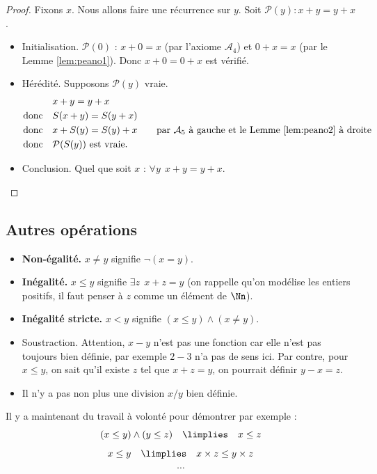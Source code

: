 \documentclass[11pt,class=report,crop=false]{standalone}
\begin{document}
\begin{proof}
Fixons $x$. Nous allons faire une récurrence sur $y$. 
Soit $\mathcal{P}(y) : x+y = y+x$.
\begin{itemize}
	\item Initialisation. $\mathcal{P}(0)$ : $x+0=x$ (par l'axiome $\mathcal{A}_4$) et $0+x=x$ (par le Lemme \ref{lem:peano1}). Donc $x+0=0+x$ est vérifié.
	
	\item Hérédité. Supposons $\mathcal{P}(y)$ vraie. 
	\begin{align*}
					& x+y = y+x \\
		\text{donc} \quad & S(x+y) = S(y+x) \\
		\text{donc} \quad & x+S(y) = S(y)+x \qquad \text{par $\mathcal{A}_5$ à gauche et le Lemme \ref{lem:peano2} à droite} \\
		\text{donc} \quad & \mathcal{P}(S(y)) \text{ est vraie.} 
	\end{align*}	
		
	\item Conclusion. Quel que soit $x$ : $\forall y \ \ x+y=y+x$.
\end{itemize}
\end{proof}

\subsection{Autres opérations}


\begin{itemize}
	\item \textbf{Non-égalité.} $x \neq y$ signifie $\lnot(x=y)$.
	\item \textbf{Inégalité.} $x \le y$ signifie $\exists z \ \ x+z=y$ (on rappelle qu'on modélise les entiers positifs, il faut penser à $z$ comme un élément de $\Nn$).
	\item \textbf{Inégalité stricte.} $x < y$ signifie $(x \le y) \land (x \neq y)$.
	\item Soustraction. Attention, $x-y$ n'est pas une fonction car elle n'est pas toujours bien définie, par exemple $2-3$ n'a pas de sens ici. Par contre, pour $x \le y$, on sait qu'il existe $z$ tel que $x+z=y$, on pourrait définir $y-x=z$.
	\item Il n'y a pas non plus une division $x/y$ bien définie.
\end{itemize}

Il y a maintenant du travail à volonté pour démontrer par exemple :
\[ (x \le y) \land (y \le z) \quad \limplies \quad x \le z \]
\[ x \le y \quad \limplies \quad x \times z \le y \times z \]
\[ \cdots \]
\end{document}
